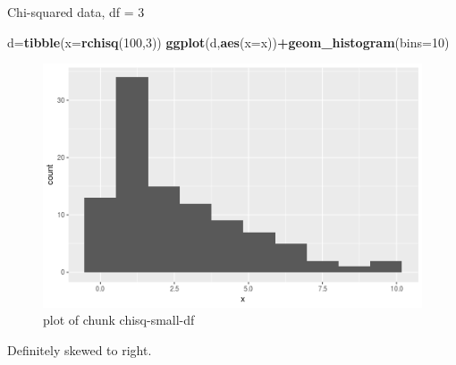 \documentclass[ignorenonframetext,]{beamer}
\newenvironment{Shaded}{\begin{snugshade}}{\end{snugshade}}
\newcommand{\DataTypeTok}[1]{\textcolor[rgb]{0.13,0.29,0.53}{#1}}
\newcommand{\DecValTok}[1]{\textcolor[rgb]{0.00,0.00,0.81}{#1}}
\newcommand{\KeywordTok}[1]{\textcolor[rgb]{0.13,0.29,0.53}{\textbf{#1}}}
\newcommand{\NormalTok}[1]{#1}
\newcommand{\OperatorTok}[1]{\textcolor[rgb]{0.81,0.36,0.00}{\textbf{#1}}}
\begin{document}
\begin{frame}[fragile]{Chi-squared data, df = 3}
\protect\hypertarget{chi-squared-data-df-3}{}

\begin{Shaded}
\begin{Highlighting}[]
\NormalTok{d=}\KeywordTok{tibble}\NormalTok{(}\DataTypeTok{x=}\KeywordTok{rchisq}\NormalTok{(}\DecValTok{100}\NormalTok{,}\DecValTok{3}\NormalTok{))}
\KeywordTok{ggplot}\NormalTok{(d,}\KeywordTok{aes}\NormalTok{(}\DataTypeTok{x=}\NormalTok{x))}\OperatorTok{+}\KeywordTok{geom_histogram}\NormalTok{(}\DataTypeTok{bins=}\DecValTok{10}\NormalTok{)}
\end{Highlighting}
\end{Shaded}

\begin{figure}
\centering
\includegraphics{figure/chisq-small-df-1.png}
\caption{plot of chunk chisq-small-df}
\end{figure}

Definitely skewed to right.

\end{frame}
\end{document}
